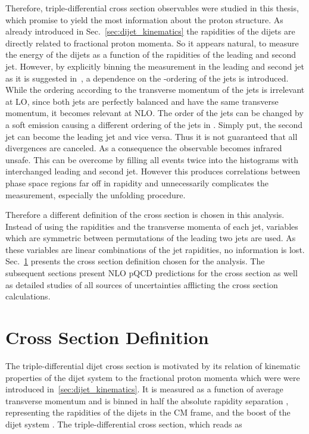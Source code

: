 Therefore, triple-differential cross section observables were studied in this
thesis, which promise to yield the most information about the proton structure.
As already introduced in Sec.~\ref{sec:dijet_kinematics} the rapidities of the
dijets are directly related to fractional proton momenta. So it appears natural,
to measure the energy of the dijets as a function of the rapidities of the
leading and second jet. However, by explicitly binning the measurement in the
leading and second jet as it is suggested in~\cite{Giele:1994xd}, a dependence
on the \pt-ordering of the jets is introduced. While the ordering according to the
transverse momentum of the jets is irrelevant at LO, since both jets are
perfectly balanced and have the same transverse momentum, it becomes relevant at
NLO. The order of the jets can be changed by a soft emission causing a different
ordering of the jets in \pt. Simply put, the second jet can become the leading
jet and vice versa. Thus it is not guaranteed that all divergences are canceled.
As a consequence the observable becomes infrared unsafe. This can be overcome by
filling all events twice into the histograms with interchanged leading and
second jet. However this produces correlations between phase space regions far
off in rapidity and unnecessarily complicates the measurement, especially the
unfolding procedure.

Therefore a different definition of the cross section is chosen in this
analysis. Instead of using the rapidities and the transverse momenta of each
jet, variables which are symmetric between permutations of the leading two
jets are used. As these variables are linear combinations of the jet rapidities,
no information is lost. Sec.~\ref{sec:crosssection_definition} presents the
cross section definition chosen for the analysis. The subsequent sections  present
NLO pQCD predictions for the cross section as well as detailed studies of all
sources of uncertainties afflicting the cross section calculations.

\section{Cross Section Definition}
\label{sec:crosssection_definition}

The triple-differential dijet cross section is motivated by its relation of
kinematic properties of the dijet system to the fractional proton momenta which
were were introduced in~\ref{sec:dijet_kinematics}. It is measured as a function
of average transverse momentum \ptavg and is binned in half the absolute
rapidity separation \ystar, representing the rapidities of the dijets in the CM
frame, and the boost of the dijet system \yboost. The triple-differential cross
section, which reads as

